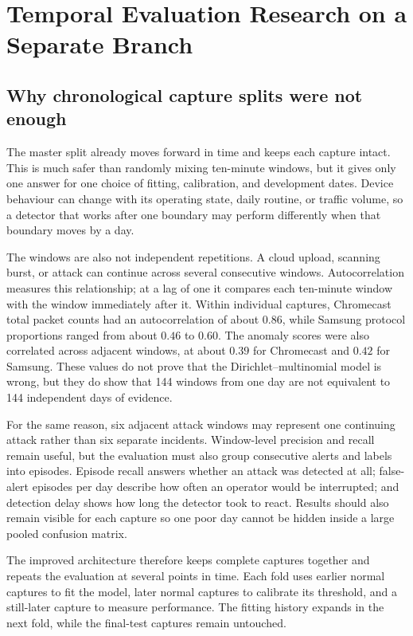 \section{Temporal Evaluation Research on a Separate Branch}
\label{sec:temporal-wip}

\subsection{Why chronological capture splits were not enough}

The master split already moves forward in time and keeps each capture intact.
This is much safer than randomly mixing ten-minute windows, but it gives only one
answer for one choice of fitting, calibration, and development dates. Device
behaviour can change with its operating state, daily routine, or traffic volume,
so a detector that works after one boundary may perform differently when that
boundary moves by a day.

The windows are also not independent repetitions. A cloud upload, scanning
burst, or attack can continue across several consecutive windows. Autocorrelation
measures this relationship; at a lag of one it compares each ten-minute window
with the window immediately after it. Within individual captures, Chromecast
total packet counts had an autocorrelation of about $0.86$, while Samsung
protocol proportions ranged from about $0.46$ to $0.60$. The anomaly scores were
also correlated across adjacent windows, at about $0.39$ for Chromecast and
$0.42$ for Samsung. These values do not prove that the Dirichlet--multinomial
model is wrong, but they do show that 144 windows from one day are not equivalent
to 144 independent days of evidence.

For the same reason, six adjacent attack windows may represent one continuing
attack rather than six separate incidents. Window-level precision and recall
remain useful, but the evaluation must also group consecutive alerts and labels
into episodes. Episode recall answers whether an attack was detected at all;
false-alert episodes per day describe how often an operator would be interrupted;
and detection delay shows how long the detector took to react. Results should
also remain visible for each capture so one poor day cannot be hidden inside a
large pooled confusion matrix.

The improved architecture therefore keeps complete captures together and repeats
the evaluation at several points in time. Each fold uses earlier normal captures
to fit the model, later normal captures to calibrate its threshold, and a
still-later capture to measure performance. The fitting history expands in the
next fold, while the final-test captures remain untouched.

